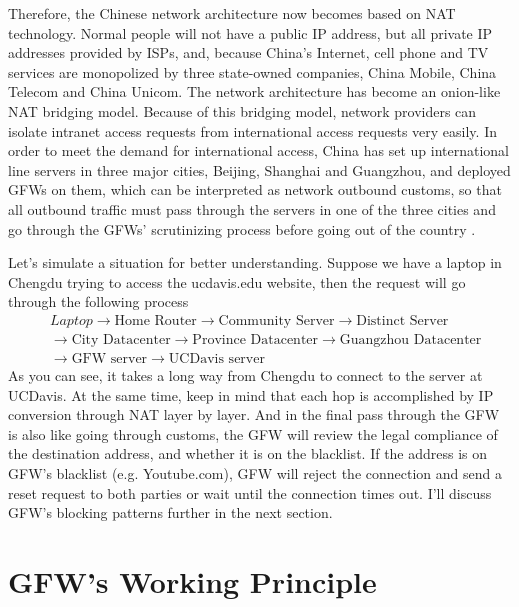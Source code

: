 \documentclass[11pt]{article}
\begin{document}
Therefore, the Chinese network architecture now becomes based on NAT technology.
Normal people will not have a public IP address, but all private IP
addresses provided by ISPs, and, because China's Internet, cell phone and TV
services are monopolized by three state-owned companies, China Mobile, China
Telecom and China Unicom. The network architecture has become an onion-like NAT
bridging model. Because of this bridging model, network providers can isolate
intranet access requests from international access requests very easily. In
order to meet the demand for international access, China has set up
international line servers in three major cities, Beijing, Shanghai and
Guangzhou, and deployed GFWs on them, which can be interpreted as network
outbound customs, so that all outbound traffic must pass through the servers in
one of the three cities and go through the GFWs' scrutinizing process before
going out of the country \cite{GlobalNetServer}.

Let's simulate a situation for better understanding. Suppose we have a laptop in
Chengdu trying to access the ucdavis.edu website, then the request will go
through the following process
\begin{align*} &Laptop \rightarrow \text{Home Router} \rightarrow
\text{Community Server} \rightarrow \text{Distinct Server}\\ &\rightarrow
\text{City Datacenter} \rightarrow \text{Province Datacenter} \rightarrow
\text{Guangzhou Datacenter}\\ &\rightarrow \text{GFW server} \rightarrow
\text{UCDavis server} \end{align*}
As you can see, it takes a long way from Chengdu to connect to the server at UCDavis.
At the same time, keep in mind that each hop is accomplished by IP conversion
through NAT layer by layer. And in the final pass through the GFW is also like
going through customs, the GFW will review the legal compliance of the
destination address, and whether it is on the blacklist. If the address is on
GFW's blacklist (e.g. Youtube.com), GFW will reject the connection and send a
reset request to both parties or wait until the connection times out. I'll
discuss GFW's blocking patterns further in the next section.

\section{GFW's Working Principle}
\end{document}
